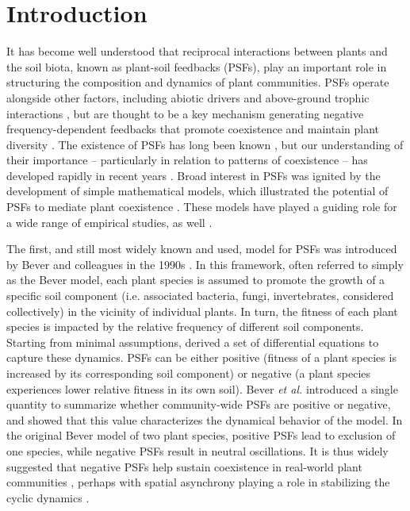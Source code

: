 \documentclass[11pt]{article}
\begin{document}
\section{Introduction}

It has become well understood that reciprocal interactions between plants and the soil biota, known as plant-soil feedbacks (PSFs), play an important role in structuring the composition and dynamics of plant communities. PSFs operate alongside other factors, including abiotic drivers \citep{bennett2019mechanisms} and above-ground trophic interactions \citep{van2009empirical}, but are thought to be a key mechanism generating negative frequency-dependent feedbacks that promote coexistence and maintain plant diversity \citep{kulmatiski2008plant,van2013plant,bever2015maintenance}. The existence of PSFs has long been known \citep{van1993plant,bever1994feedback}, but our understanding of their importance -- particularly in relation to patterns of coexistence -- has developed rapidly in recent years \citep{klironomos2002feedback,petermann2008janzen,mangan2010negative}. Broad interest in PSFs was ignited by the development of simple mathematical models, which illustrated the potential of PSFs to mediate plant coexistence \citep{bever1997incorporating,bever2003soil,ke2015incorporating}. These models have played a guiding role for a wide range of empirical studies, as well \citep{kulmatiski2008plant,kulmatiski2011testing,pernilla2010plant}.

The first, and still most widely known and used, model for PSFs was introduced by Bever and colleagues in the 1990s \citep{bever1992ecological,bever1997incorporating,bever1999dynamics,bever2003soil}. In this framework, often referred to simply as the Bever model, each plant species is assumed to promote the growth of a specific soil component (i.e. associated bacteria, fungi, invertebrates, considered collectively) in the vicinity of individual plants. In turn, the fitness of each plant species is impacted by the relative frequency of different soil components. Starting from minimal assumptions, \citet{bever1997incorporating} derived a set of differential equations to capture these dynamics. PSFs can be either positive (fitness of a plant species is increased by its corresponding soil component) or negative (a plant species experiences lower relative fitness in its own soil). Bever \textit{et al.} introduced a single quantity to summarize whether community-wide PSFs are positive or negative, and showed that this value characterizes the dynamical behavior of the model. In the original Bever model of two plant species, positive PSFs lead to exclusion of one species, while negative PSFs result in neutral oscillations. It is thus widely suggested that negative PSFs help sustain coexistence in real-world plant communities \citep{kulmatiski2008plant,van2013plant}, perhaps with spatial asynchrony playing a role in stabilizing the cyclic dynamics \citep{revilla2013plant,bever2003soil}.
\end{document}
